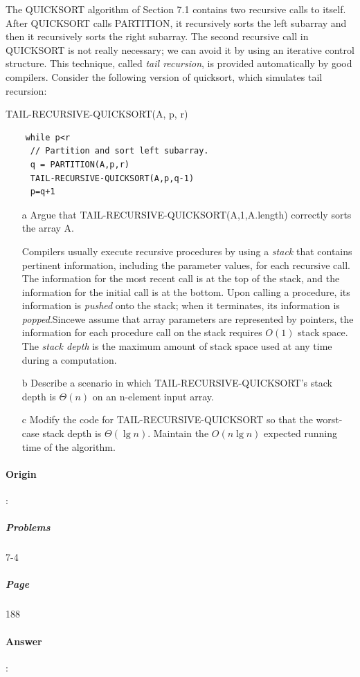 \documentclass{article}
\begin{document}
  The QUICKSORT algorithm of Section 7.1 contains two recursive calls to itself. After QUICKSORT calls PARTITION, it recursively sorts the left subarray and then it recursively sorts the right subarray. The second recursive call in QUICKSORT is not really necessary; we can avoid it by using an iterative control structure. This technique, called \textit{tail recursion}, is provided automatically by good compilers. Consider the following version of quicksort, which simulates tail recursion:

  TAIL-RECURSIVE-QUICKSORT(A, p, r)

  \begin{lstlisting}
    while p<r
     // Partition and sort left subarray.
     q = PARTITION(A,p,r)
     TAIL-RECURSIVE-QUICKSORT(A,p,q-1)
     p=q+1
  \end{lstlisting}

  \begin{enumerate}
    \item[a] Argue that TAIL-RECURSIVE-QUICKSORT(A,1,A.length) correctly sorts the array A.
    

    Compilers usually execute recursive procedures by using a \textit{stack} that contains pertinent information, including the parameter values, for each recursive call. The information for the most recent call is at the top of the stack, and the information for the initial call is at the bottom. Upon calling a procedure, its information is \textit{pushed} onto the stack; when it terminates, its information is \textit{popped}.Sincewe assume that array parameters are represented by pointers, the information for each procedure call on the stack requires $O(1)$ stack space. The \textit{stack depth} is the maximum amount of stack space used at any time during a computation.
    
    
    \item[b] Describe a scenario in which TAIL-RECURSIVE-QUICKSORT's stack depth is $\Theta(n)$ on an n-element input array.
    \item[c] Modify the code for TAIL-RECURSIVE-QUICKSORT so that the worst-case stack depth is $\Theta(\lg n)$. Maintain the $O(n \lg n)$ expected running time of the algorithm.
  \end{enumerate}

  \paragraph{Origin}:
    \subparagraph{Problems}7-4
    \subparagraph{Page}188
  \paragraph{Answer}:
\end{document}
